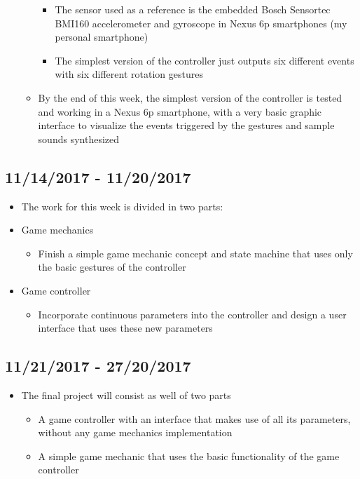 \begin{itemize}
\begin{itemize}
\begin{itemize}
					\item The sensor used as a reference is the embedded Bosch Sensortec BMI160 accelerometer and gyroscope in Nexus 6p smartphones (my personal smartphone)
					\item The simplest version of the controller just outputs six different events with six different rotation gestures
				\end{itemize}
				\item By the end of this week, the simplest version of the controller is tested and working in a Nexus 6p smartphone, with a very basic graphic interface to visualize the events triggered by the gestures and sample sounds synthesized
			\end{itemize}
		\end{itemize}
		\subsection{11/14/2017 - 11/20/2017}
			\begin{itemize}
				\item The work for this week is divided in two parts:
				\item Game mechanics
				\begin{itemize}
					\item Finish a simple game mechanic concept and state machine that uses only the basic gestures of the controller
				\end{itemize}
				\item Game controller
				\begin{itemize}
					\item Incorporate continuous parameters into the controller and design a user interface that uses these new parameters
				\end{itemize}
			\end{itemize}
		\subsection{11/21/2017 - 27/20/2017}
			\begin{itemize}
				\item The final project will consist as well of two parts
				\begin{itemize}
					\item A game controller with an interface that makes use of all its parameters, without any game mechanics implementation
					\item A simple game mechanic that uses the basic functionality of the game controller
				\end{itemize}
			\end{itemize}
